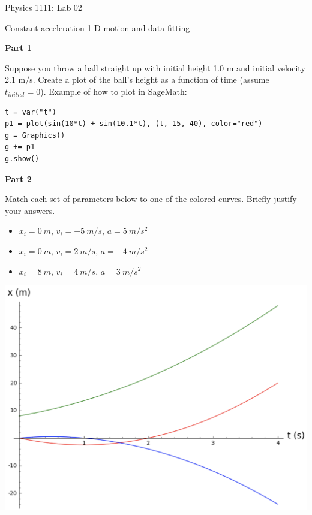 \documentclass[12pt]{article}
\begin{document}
{\centering
\large Physics 1111: Lab 02 \par
\large Constant acceleration 1-D motion and data fitting \par
}
\hfill \break \vspace{-4mm}

\underline{\textbf{Part 1}} \par
Suppose you throw a ball straight up with initial height 1.0 m and initial velocity 2.1 m/s.
Create a plot of the ball's height as a function of time (assume $t_{initial} = 0$).
\hfill \break
\hfill \break
Example of how to plot in SageMath:
\begin{verbatim}
t = var("t")
p1 = plot(sin(10*t) + sin(10.1*t), (t, 15, 40), color="red")
g = Graphics()
g += p1
g.show()
\end{verbatim}
\hfill \break \vspace{-4mm}

\underline{\textbf{Part 2}} \par
Match each set of parameters below to one of the colored curves.
Briefly justify your answers.
\begin{itemize}
  \item $x_i = 0 \ m$, $v_i = -5 \ m/s$, $a = 5 \ m/s^2$
  \item $x_i = 0 \ m$, $v_i = 2 \ m/s$, $a = -4 \ m/s^2$
  \item $x_i = 8 \ m$, $v_i = 4 \ m/s$, $a = 3 \ m/s^2$
\end{itemize}
\includegraphics[scale=0.5]{threeCurves.png}
\end{document}
